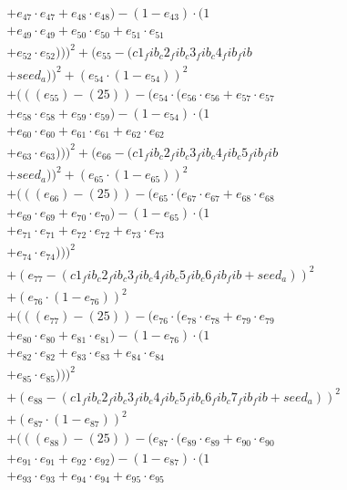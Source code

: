 \documentclass[10pt, a4paper]{article}
\begin{document}
\begin{align*}
& + e_{47} \cdot e_{47} + e_{48} \cdot e_{48}) - (1 - e_{43}) \cdot (1 \\
& + e_{49} \cdot e_{49} + e_{50} \cdot e_{50} + e_{51} \cdot e_{51} \\
& + e_{52} \cdot e_{52})))^{2} + (e_{55} - (c1_fib_c2_fib_c3_fib_c4_fib_fib \\
& + seed_a))^{2} + (e_{54} \cdot (1 - e_{54}))^{2} \\
& + (((e_{55}) - (25)) - (e_{54} \cdot (e_{56} \cdot e_{56} + e_{57} \cdot e_{57} \\
& + e_{58} \cdot e_{58} + e_{59} \cdot e_{59}) - (1 - e_{54}) \cdot (1 \\
& + e_{60} \cdot e_{60} + e_{61} \cdot e_{61} + e_{62} \cdot e_{62} \\
& + e_{63} \cdot e_{63})))^{2} + (e_{66} - (c1_fib_c2_fib_c3_fib_c4_fib_c5_fib_fib \\
& + seed_a))^{2} + (e_{65} \cdot (1 - e_{65}))^{2} \\
& + (((e_{66}) - (25)) - (e_{65} \cdot (e_{67} \cdot e_{67} + e_{68} \cdot e_{68} \\
& + e_{69} \cdot e_{69} + e_{70} \cdot e_{70}) - (1 - e_{65}) \cdot (1 \\
& + e_{71} \cdot e_{71} + e_{72} \cdot e_{72} + e_{73} \cdot e_{73} \\
& + e_{74} \cdot e_{74})))^{2} \\
& + (e_{77} - (c1_fib_c2_fib_c3_fib_c4_fib_c5_fib_c6_fib_fib + seed_a))^{2} \\
& + (e_{76} \cdot (1 - e_{76}))^{2} \\
& + (((e_{77}) - (25)) - (e_{76} \cdot (e_{78} \cdot e_{78} + e_{79} \cdot e_{79} \\
& + e_{80} \cdot e_{80} + e_{81} \cdot e_{81}) - (1 - e_{76}) \cdot (1 \\
& + e_{82} \cdot e_{82} + e_{83} \cdot e_{83} + e_{84} \cdot e_{84} \\
& + e_{85} \cdot e_{85})))^{2} \\
& + (e_{88} - (c1_fib_c2_fib_c3_fib_c4_fib_c5_fib_c6_fib_c7_fib_fib + seed_a))^{2} \\
& + (e_{87} \cdot (1 - e_{87}))^{2} \\
& + (((e_{88}) - (25)) - (e_{87} \cdot (e_{89} \cdot e_{89} + e_{90} \cdot e_{90} \\
& + e_{91} \cdot e_{91} + e_{92} \cdot e_{92}) - (1 - e_{87}) \cdot (1 \\
& + e_{93} \cdot e_{93} + e_{94} \cdot e_{94} + e_{95} \cdot e_{95} \\

\end{align*}
\end{document}
